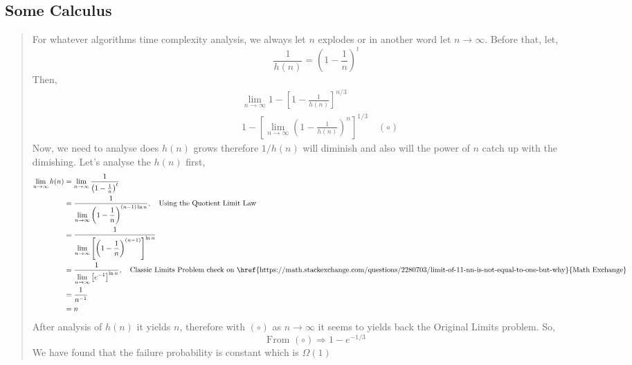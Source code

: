 \documentclass[a4paper, 12pt]{article}
\begin{document}
    \subsection{Some Calculus}
        \begin{quote}
            For whatever algorithms time complexity analysis, we always let $n$ explodes or in another word let $n\rightarrow\infty$. Before that,
            let,
            \begin{equation*}
                \frac{1}{h(n)}= \left(1-\frac{1}{n}\right)^t
            \end{equation*}
            Then,
            \begin{align*}
                &\lim_{n\rightarrow\infty} 1-\left[1-\frac{1}{h(n)}\right]^{n/3}\\
                &1 - \left[\lim_{n\rightarrow\infty}\left(1-\frac{1}{h(n)}\right)^n\right]^{1/3}\quad(\circ)
            \end{align*}
            Now, we need to analyse does $h(n)$ grows therefore $1/h(n)$ will diminish and also will the power of $n$ catch up with the dimishing. Let's analyse
            the $h(n)$ first,
            \begin{align*}
                \lim_{n\rightarrow\infty}h(n) &= \lim_{n\rightarrow\infty}\frac{1}{\left(1-\frac{1}{n}\right)^t}\\
                &= \frac{1}{\displaystyle\lim_{n\rightarrow\infty}\left(1-\frac{1}{n}\right)^{(n-1)\ln n}},\quad\text{Using the Quotient Limit Law}\\
                &= \frac{1}{\displaystyle\lim_{n\rightarrow\infty}\left[\left(1-\frac{1}{n}\right)^{(n-1)}\right]^{\ln n}}\\
                &= \frac{1}{\displaystyle\lim_{n\rightarrow\infty}\left[e^{-1}\right]^{\ln n}},\quad\text{Classic Limits Problem check on }\text{\href{https://math.stackexchange.com/questions/2280703/limit-of-11-nn-is-not-equal-to-one-but-why}{Math Exchange}}\\
                &= \frac{1}{n^{-1}}\\
                &= n\\
            \end{align*}
            After analysis of $h(n)$ it yields $n$, therefore with $(\circ)$ as $n\rightarrow\infty$ it seems to yields back the Original Limits problem. So,
            \begin{equation*}
                \text{From } (\circ)\Rightarrow 1 - e^{-1/3}
            \end{equation*}
            We have found that the failure probability is constant which is $\Omega(1)$
        \end{quote}
\end{document}
